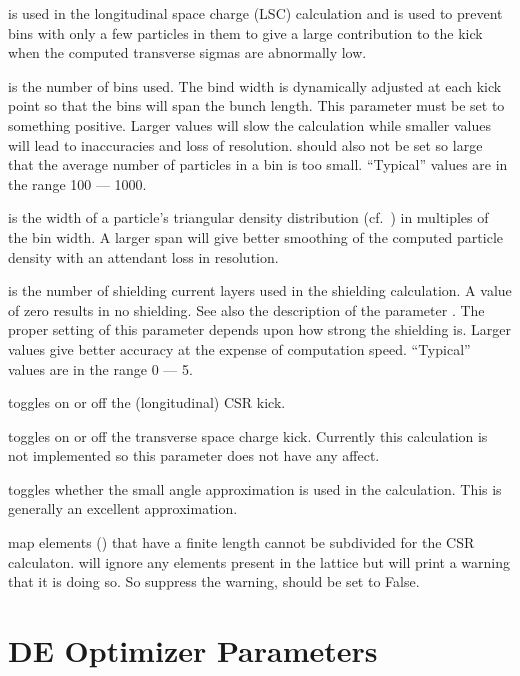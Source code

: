 {{{{{{{{{ is used in the longitudinal space charge (LSC)
calculation and is used to prevent bins with only a few particles in
them to give a large contribution to the kick when the computed
transverse sigmas are abnormally low.

 is the number of bins used. The bind width is dynamically
adjusted at each kick point so that the bins will span the bunch
length.  This parameter must be set to something positive. Larger
values will slow the calculation while smaller values will lead to
inaccuracies and loss of resolution.  should also not be set
so large that the average number of particles in a bin is too small. 
``Typical'' values are in the range 100 --- 1000.

 is the width of a particle's triangular density
distribution (cf.~) in multiples of the bin width. A
larger span will give better smoothing of the computed particle
density with an attendant loss in resolution.

 is the number of shielding current layers used in
the shielding calculation. A value of zero results in no
shielding. See also the description of the parameter
. The proper setting of this parameter depends
upon how strong the shielding is. Larger values give better accuracy
at the expense of computation speed. ``Typical'' values are in the
range 0 --- 5.

 toggles on or off the (longitudinal) CSR kick.

 toggles on or off the transverse space charge
kick. Currently this calculation is not implemented so this parameter
does not have any affect.

 toggles whether the small angle approximation
is used in the calculation. This is generally an excellent
approximation.

 map elements () that have a finite length
cannot be subdivided for the CSR calculaton. \bmad will ignore any
 elements present in the lattice but will print a warning
that it is doing so. So suppress the warning, 
should be set to False.

\section{DE Optimizer Parameters}
\label{s:de.params}

}}}}}}}}}
